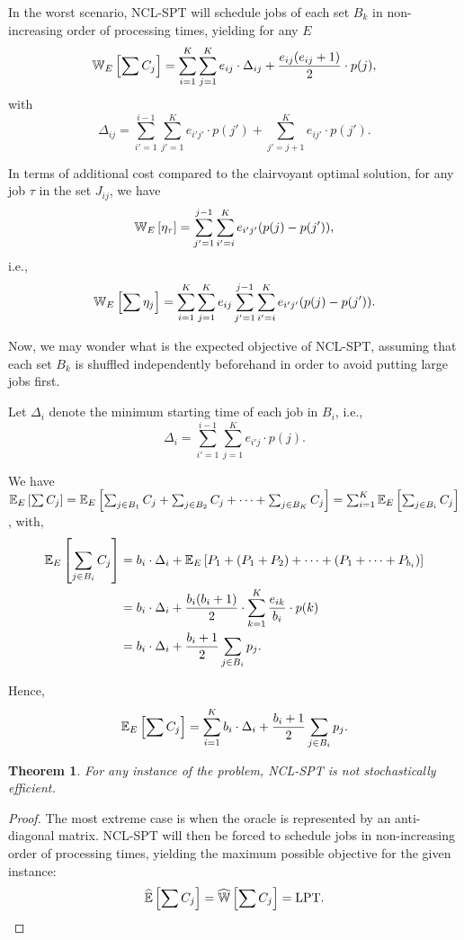 \documentclass{article}
\newtheorem{theorem}{Theorem}
\begin{document}
In the worst scenario, NCL-SPT will schedule jobs of each set \(B_k\) in non-increasing order of processing times, yielding for any \(E\)
\[
    \mathbb{W}_E\left[\sum C_j\right]=\sum_{i=1}^{K} \sum_{j=1}^{K} e_{ij} \cdot \Delta_{ij} + \frac{e_{ij}(e_{ij}+1)}{2} \cdot p(j),
\]
with
\[
    \Delta_{ij}=\sum_{i'=1}^{i-1} \sum_{j'=1}^{K} e_{i'j'} \cdot p(j') + \sum_{j'=j+1}^{K} e_{ij'} \cdot p(j').
\]

In terms of additional cost compared to the clairvoyant optimal solution, for any job \(\tau\) in the set \(J_{ij}\), we have
\[
    \mathbb{W}_E\left[\eta_{\tau}\right]=\sum_{j'=1}^{j-1}\sum_{i'=i}^K e_{i'j'}(p(j)-p(j')),
\]
i.e.,
\[
    \mathbb{W}_E\left[\sum\eta_j\right]=\sum_{i=1}^K \sum_{j=1}^K e_{ij} \sum_{j'=1}^{j-1}\sum_{i'=i}^K e_{i'j'}(p(j)-p(j')).
\]

Now, we may wonder what is the expected objective of NCL-SPT, assuming that each set \(B_k\) is shuffled independently beforehand in order to avoid putting large jobs first.

Let \(\Delta_i\) denote the minimum starting time of each job in \(B_i\), i.e.,
\[
    \Delta_i=\sum_{i'=1}^{i-1} \sum_{j=1}^{K} e_{i'j} \cdot p(j).
\]

We have \(\mathbb{E}_E\left[\sum C_j\right]=\mathbb{E}_E\left[\sum_{j\in B_1} C_j + \sum_{j\in B_2} C_j + \dots + \sum_{j\in B_K} C_j\right]=\sum_{i=1}^{K} \mathbb{E}_E\left[\sum_{j\in B_i} C_j\right]\), with,
\begin{align*}
    \mathbb{E}_E\left[\sum_{j\in B_i} C_j\right]
    &=b_i \cdot \Delta_i + \mathbb{E}_E\left[P_1+(P_1+P_2)+\dots+(P_1+\dots+P_{b_i})\right] \\
    &=b_i \cdot \Delta_i + \frac{b_i(b_i+1)}{2} \cdot \sum_{k=1}^{K} \frac{e_{ik}}{b_i} \cdot p(k) \\
    &=b_i \cdot \Delta_i + \frac{b_i+1}{2} \sum_{j\in B_i} p_j.
\end{align*}

Hence,
\[
    \mathbb{E}_E\left[\sum C_j\right]=\sum_{i=1}^{K} b_i \cdot \Delta_i + \frac{b_i+1}{2} \sum_{j\in B_i} p_j.
\]

\begin{theorem}
    For any instance of the problem, NCL-SPT is \emph{not} stochastically efficient.
\end{theorem}
\begin{proof}
    The most extreme case is when the oracle is represented by an anti-diagonal matrix.
    NCL-SPT will then be forced to schedule jobs in non-increasing order of processing times, yielding the maximum possible objective for the given instance:
    \[
        \widehat{\mathbb{E}}\left[\sum C_j\right]=\widehat{\mathbb{W}}\left[\sum C_j\right]=\text{LPT}.
    \]

\end{proof}
\end{document}
